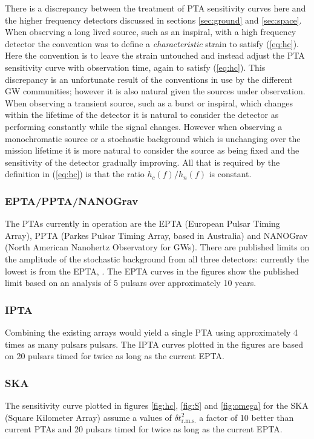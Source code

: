 There is a discrepancy between the treatment of PTA sensitivity curves here and the higher frequency detectors discussed in sections \ref{sec:ground} and \ref{sec:space}. When observing a long lived source, such as an inspiral, with a high frequency detector the convention was to define a \emph{characteristic} strain to satisfy (\ref{eq:hc}). Here the convention is to leave the strain untouched and instead adjust the PTA sensitivity curve with observation time, again to satisfy (\ref{eq:hc}). This discrepancy is an unfortunate result of the conventions in use by the different GW communities; however it is also natural given the sources under observation. When observing a transient source, such as a burst or inspiral, which changes within the lifetime of the detector it is natural to consider the detector as performing constantly while the signal changes. However when observing a monochromatic source or a stochastic background which is unchanging over the mission lifetime it is more natural to consider the source as being fixed and the sensitivity of the detector gradually improving. All that is required by the definition in (\ref{eq:hc}) is that the ratio $h_{c}(f)/h_{n}(f)$ is constant.

\subsubsection{EPTA/PPTA/NANOGrav}
The PTAs currently in operation are the EPTA (European Pulsar Timing Array), PPTA (Parkes Pulsar Timing Array, based in  Australia) and NANOGrav (North American Nanohertz Observatory for GWs). There are published limits on the amplitude of the stochastic background from all three detectors: currently the lowest is from the EPTA, \cite{Haasteren}. The EPTA curves in the figures show the  published limit based on an analysis of 5 pulsars over approximately 10 years.

\subsubsection{IPTA}
Combining the existing arrays would yield a single PTA using approximately 4 times as many pulsars pulsars. The IPTA curves plotted in the figures are based on 20 pulsars timed for twice as long as the current EPTA.

\subsubsection{SKA}
The sensitivity curve plotted in figures \ref{fig:hc}, \ref{fig:S} and \ref{fig:omega} for the SKA (Square Kilometer Array) assume a values of $\delta t^{2}_{\textrm{r.m.s.}}$ a factor of 10 better than current PTAs and 20 pulsars timed for twice as long as the current EPTA.

